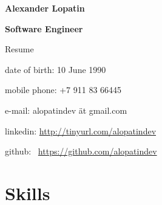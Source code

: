 \begin{center}
\fontsize{16pt}{12pt}\selectfont
\bfseries Alexander Lopatin\mdseries

\fontsize{12pt}{12pt}\selectfont
\bfseries Software Engineer\mdseries

Resume
\end{center}
{
\fontsize{10pt}{8pt}\selectfont
\begin{center}
\item date of birth: 10 June 1990
\item mobile phone: +7 911 83 66445
\item e-mail: alopatindev ät gmail.com
\item linkedin: \href{http://tinyurl.com/alopatindev}{http://tinyurl.com/alopatindev}
\item github: \
\href{https://github.com/alopatindev?tab=repositories}{https://github.com/alopatindev}
\end{center}
}


\fontsize{11pt}{12pt}\selectfont

\section{Skills}

